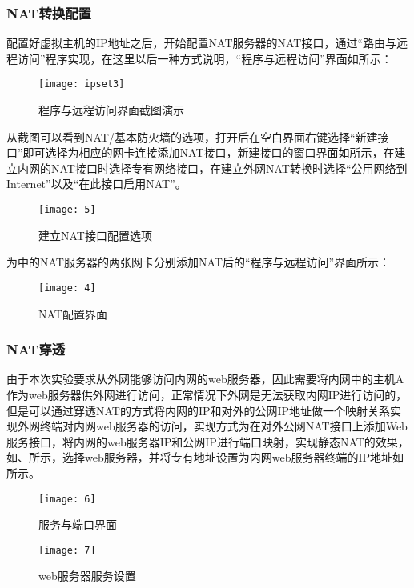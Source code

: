 \documentclass[lang=cn,11pt]{elegantpaper}
\begin{document}
\subsubsection{NAT转换配置}
配置好虚拟主机的IP地址之后，开始配置NAT服务器的NAT接口，通过“路由与远程访问”程序实现，在这里以后一种方式说明，“程序与远程访问”界面如所示：

\begin{figure}[htbp]
	\centering
	\texttt{[image: ipset3]}
	\caption{程序与远程访问界面截图演示\label{fig:jiemian}}
\end{figure}


从截图可以看到NAT/基本防火墙的选项，打开后在空白界面右键选择“新建接口”即可选择为相应的网卡连接添加NAT接口，新建接口的窗口界面如所示，在建立内网的NAT接口时选择专有网络接口，在建立外网NAT转换时选择“公用网络到Internet”以及“在此接口启用NAT”。
\begin{figure}[htbp]
		\centering
		\texttt{[image: 5]}
			\caption{建立NAT接口配置选项 \label{fig:5}}
\end{figure}

为中的NAT服务器的两张网卡分别添加NAT后的“程序与远程访问”界面所示：

\begin{figure}[htbp]
	\centering
	\texttt{[image: 4]}
	\caption{NAT配置界面\label{fig:3}}
\end{figure}

\subsubsection{NAT穿透}
由于本次实验要求从外网能够访问内网的web服务器，因此需要将内网中的主机A作为web服务器供外网进行访问，正常情况下外网是无法获取内网IP进行访问的，但是可以通过穿透NAT的方式将内网的IP和对外的公网IP地址做一个映射关系实现外网终端对内网web服务器的访问，实现方式为在对外公网NAT接口上添加Web服务接口，将内网的web服务器IP和公网IP进行端口映射，实现静态NAT的效果，如、所示，选择web服务器，并将专有地址设置为内网web服务器终端的IP地址如所示。

\begin{figure}[htbp]
	\begin{minipage}[t]{0.5\textwidth}
		\centering
		\texttt{[image: 6]}
			\caption{服务与端口界面 \label{fig:6}}
	\end{minipage}
	\begin{minipage}[t]{0.5\textwidth}
		\centering
		\texttt{[image: 7]}
			\caption{web服务器服务设置 \label{fig:7}}
	\end{minipage}

\end{figure}
\end{document}
